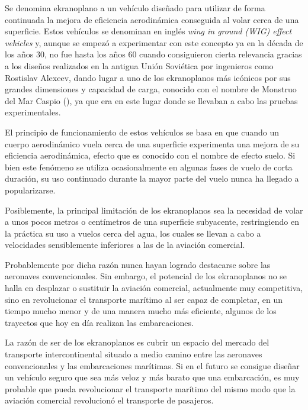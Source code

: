 Se denomina ekranoplano a un vehículo diseñado para utilizar de forma continuada la mejora de eficiencia aerodinámica conseguida al volar cerca de una superficie. Estos vehículos se denominan en inglés \emph{wing in ground (WIG) effect vehicles} y, aunque se empezó a experimentar con este concepto ya en la década de los años 30\cite{ref:kaario}, no fue hasta los años 60 cuando consiguieron cierta relevancia gracias a los diseños realizados en la antigua Unión Soviética por ingenieros como Rostislav Alexeev\cite{ref:alexeev}, dando lugar a uno de los ekranoplanos más icónicos por sus grandes dimensiones y capacidad de carga, conocido con el nombre de Monstruo del Mar Caspio (), ya que era en este lugar donde se llevaban a cabo las pruebas experimentales.


El principio de funcionamiento de estos vehículos se basa en que cuando un cuerpo aerodinámico vuela cerca de una superficie experimenta una mejora de su eficiencia aerodinámica, efecto que es conocido con el nombre de efecto suelo. Si bien este fenómeno se utiliza ocasionalmente en algunas fases de vuelo de corta duración, su uso continuado durante la mayor parte del vuelo nunca ha llegado a popularizarse.

Posiblemente, la principal limitación de los ekranoplanos sea la necesidad de volar a unos pocos metros o centímetros de una superficie subyacente, restringiendo en la práctica su uso a vuelos cerca del agua, los cuales se llevan a cabo a velocidades sensiblemente inferiores a las de la aviación comercial.

Probablemente por dicha razón nunca hayan logrado destacarse sobre las aeronaves convencionales. Sin embargo, el potencial de los ekranoplanos no se halla en desplazar o sustituir la aviación comercial, actualmente muy competitiva, sino en revolucionar el transporte marítimo al ser capaz de completar, en un tiempo mucho menor y de una manera mucho más eficiente, algunos de los trayectos que hoy en día realizan las embarcaciones.

La razón de ser de los ekranoplanos es cubrir un espacio del mercado del transporte intercontinental situado a medio camino entre las aeronaves convencionales y las embarcaciones marítimas. Si en el futuro se consigue diseñar un vehículo seguro que sea más veloz y más barato que una embarcación, es muy probable que pueda revolucionar el transporte marítimo del mismo modo que la aviación comercial revolucionó el transporte de pasajeros.

